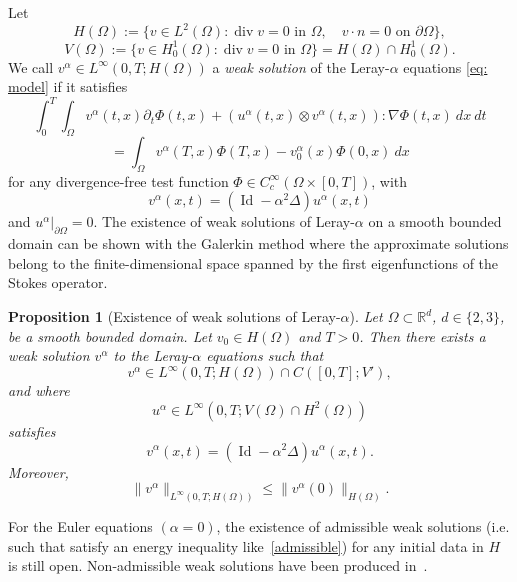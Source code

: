 \documentclass{amsart}
\newtheorem{proposition}{Proposition}
\begin{document}
Let
$$ H(\Omega):= \{v\in L^2(\Omega): \operatorname{div}v=0 \text{ in } \Omega,\quad v \cdot n = 0 \text{ on } \partial \Omega\},$$
$$V(\Omega):= \{ v\in H_0^1(\Omega): \operatorname{div}v=0\text{ in } \Omega\} = H(\Omega) \cap H_0^1(\Omega).$$
We call $v^{\alpha}\in L^{\infty}(0,T;H(\Omega))$ a \emph{weak solution} of the Leray-$\alpha$ equations \eqref{eq: model} if it satisfies
$$  \int_0^T \int_{\Omega}  v^{\alpha}(t,x) \partial_t\Phi(t,x) + (u^{\alpha}(t,x) \otimes v^{\alpha}(t,x)) : \nabla \Phi(t,x) \ dx \ dt  $$ $$= \int_{\Omega}  v^{\alpha}(T,x) \Phi(T,x) -  v^{\alpha}_0(x) \Phi(0,x) \ dx$$
for any divergence-free test function $\Phi \in C^{\infty}_c(\Omega\times [0,T] )$, with 
\begin{equation*}
 v^{\alpha}(x,t)=(\operatorname{Id}-\alpha^2 \Delta)u^{\alpha}(x,t)
\end{equation*} 
and $u^{\alpha}|_{\partial \Omega}=0$.
The existence of weak solutions of Leray-$\alpha$ on a smooth bounded domain can be shown with the Galerkin method where the approximate solutions belong to the finite-dimensional space spanned by the first eigenfunctions of the Stokes operator. 
\begin{proposition}[Existence of weak solutions of Leray-$\alpha$]
\label{prop: weak sol}
    Let $\Omega \subset \mathbb{R}^d$, $d\in \{2,3\}$, be a smooth bounded domain. Let $v_0 \in H(\Omega)$ and $T>0$. Then there exists a weak solution $v^{\alpha}$ to the Leray-$\alpha$ equations such that
    $$ v^{\alpha} \in L^{\infty}(0,T; H(\Omega)) \cap C([0,T]; V'),$$
and where
$$ u^{\alpha} \in L^{\infty}(0,T; V(\Omega)\cap H^2(\Omega))$$
satisfies
$$ v^{\alpha}(x,t)=(\operatorname{Id}-\alpha^2 \Delta)u^{\alpha}(x,t).$$
Moreover,
\begin{equation}\label{admissible}
\| v^{\alpha}\|_{L^{\infty}(0,T;H(\Omega))} \leq \|v^{\alpha}(0)\|_{H(\Omega)}. 
\end{equation}
\end{proposition}

For the Euler equations $(\alpha=0)$, the existence of admissible weak solutions (i.e. such that satisfy an energy inequality like~\eqref{admissible}) for any initial data in $H$ is still open. Non-admissible weak solutions have been produced in~\cite{wiedemann2011}.
\end{document}
